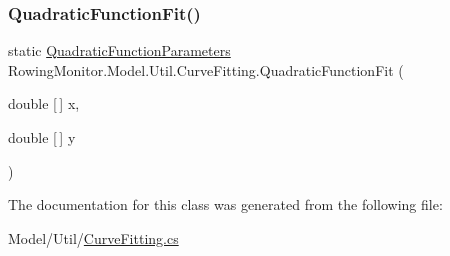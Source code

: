 \subsubsection{\texorpdfstring{Quadratic\+Function\+Fit()}{QuadraticFunctionFit()}}
{\footnotesize\ttfamily static \hyperlink{struct_rowing_monitor_1_1_model_1_1_util_1_1_curve_fitting_1_1_quadratic_function_parameters}{Quadratic\+Function\+Parameters} Rowing\+Monitor.\+Model.\+Util.\+Curve\+Fitting.\+Quadratic\+Function\+Fit (\begin{DoxyParamCaption}\item[{double \mbox{[}$\,$\mbox{]}}]{x,  }\item[{double \mbox{[}$\,$\mbox{]}}]{y }\end{DoxyParamCaption})\hspace{0.3cm}{\ttfamily [static]}}



The documentation for this class was generated from the following file\+:\begin{DoxyCompactItemize}
\item 
Model/\+Util/\hyperlink{_curve_fitting_8cs}{Curve\+Fitting.\+cs}\end{DoxyCompactItemize}
